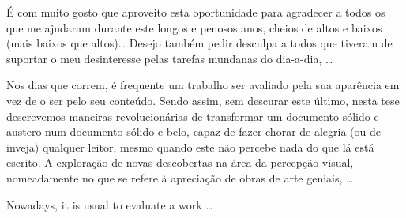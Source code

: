 \documentclass[11pt,twoside,a4paper]{report}
\begin{document}
\TitlePage
  \vspace*{55mm}
       {\'E com muito gosto que aproveito esta oportunidade para agradecer a todos os que me
        ajudaram durante este longos e penosos anos, cheios de altos e baixos (mais baixos que
        altos)\ldots}
  \TEXT{}
       {Desejo tamb\'em pedir desculpa a todos que tiveram de suportar o meu desinteresse pelas
        tarefas mundanas do dia-a-dia, \ldots}
\EndTitlePage
\titlepage\ \endtitlepage %

\TitlePage
  \vspace*{55mm}
       {Nos dias que correm, \'e frequente um trabalho ser avaliado pela sua apar\^encia em vez de
        o ser pelo seu conte\'udo. Sendo assim, sem descurar este \'ultimo, nesta tese descrevemos
        maneiras revolucion\'arias de transformar um documento s\'olido e austero num documento
        s\'olido e belo, capaz de fazer chorar de alegria (ou de inveja) qualquer leitor, mesmo
        quando este n\~ao percebe nada do que l\'a est\'a escrito.}
  \TEXT{}
       {A explora\c c\~ao de novas descobertas na \'area da percep\c c\~ao visual, nomeadamente
        no que se refere \`a aprecia\c c\~ao de obras de arte geniais, \ldots}
\EndTitlePage
\titlepage\ \endtitlepage %

\TitlePage
  \vspace*{55mm}
       {Nowadays, it is usual to evaluate a work \ldots}
\EndTitlePage
\titlepage\ \endtitlepage %


%
%


\tableofcontents

\cleardoublepage
\listoffigures

\cleardoublepage
\listoftables

\cleardoublepage


\printglossary[style=mcolindex,title=Lista de Abrevia\c c\~oes e Acr\'onimos, nonumberlist]



\end{document}
